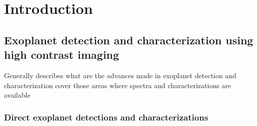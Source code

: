 \part{Introduction}
\addto{\captionsenglish}{%
  \renewcommand{\mtctitle}{Another Title}
}

\startcontents[chapters]
\printmyminitoc{
}


\chapter{Exoplanet detection and characterization using high contrast imaging}
Generally describes what are the advances made in exoplanet detection and characterization
cover those areas where spectra and characterizations are available
\section{Direct exoplanet detections and characterizations}

